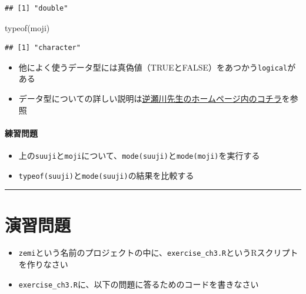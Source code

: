 \documentclass[
]{book}
\newenvironment{Shaded}{\begin{snugshade}}{\end{snugshade}}
\newcommand{\FunctionTok}[1]{\textcolor[rgb]{0.00,0.00,0.00}{#1}}
\newcommand{\NormalTok}[1]{#1}
\providecommand{\tightlist}{%
  \setlength{\itemsep}{0pt}\setlength{\parskip}{0pt}}
\begin{document}
\begin{verbatim}
## [1] "double"
\end{verbatim}

\begin{Shaded}
\begin{Highlighting}[]
\FunctionTok{typeof}\NormalTok{(moji)}
\end{Highlighting}
\end{Shaded}

\begin{verbatim}
## [1] "character"
\end{verbatim}

\begin{itemize}
\tightlist
\item
  他によく使うデータ型には真偽値（TRUEとFALSE）をあつかう\texttt{logical}がある
\item
  データ型についての詳しい説明は\href{http://www.f.waseda.jp/sakas/R/Rdata.html}{逆瀬川先生のホームページ内のコチラ}を参照
\end{itemize}

\hypertarget{ux7df4ux7fd2ux554fux984c-1}{%
\paragraph*{練習問題}\label{ux7df4ux7fd2ux554fux984c-1}}

\begin{itemize}
\tightlist
\item
  上の\texttt{suuji}と\texttt{moji}について、\texttt{mode(suuji)}と\texttt{mode(moji)}を実行する
\item
  \texttt{typeof(suuji)}と\texttt{mode(suuji)}の結果を比較する
\end{itemize}

\begin{center}\rule{0.5\linewidth}{0.5pt}\end{center}

\hypertarget{ux6f14ux7fd2ux554fux984c-1}{%
\section{演習問題}\label{ux6f14ux7fd2ux554fux984c-1}}

\begin{itemize}
\tightlist
\item
  \texttt{zemi}という名前のプロジェクトの中に、\texttt{exercise\_ch3.R}というRスクリプトを作りなさい
\item
  \texttt{exercise\_ch3.R}に、以下の問題に答るためのコードを書きなさい
\end{itemize}
\end{document}
